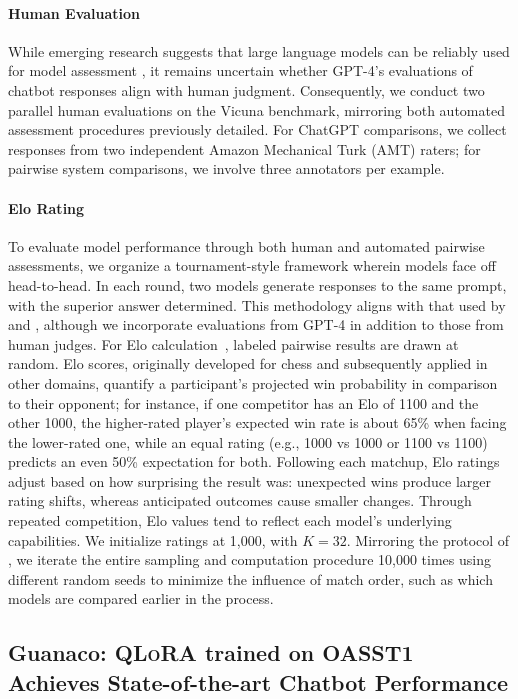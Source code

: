 \paragraph{Human Evaluation} While emerging research suggests that large language models can be reliably used for model assessment \citep{fu2023gptscore}, it remains uncertain whether GPT-4’s evaluations of chatbot responses align with human judgment. Consequently, we conduct two parallel human evaluations on the Vicuna benchmark, mirroring both automated assessment procedures previously detailed. For ChatGPT comparisons, we collect responses from two independent Amazon Mechanical Turk (AMT) raters; for pairwise system comparisons, we involve three annotators per example.

\paragraph{Elo Rating} To evaluate model performance through both human and automated pairwise assessments, we organize a tournament-style framework wherein models face off head-to-head. In each round, two models generate responses to the same prompt, with the superior answer determined. This methodology aligns with that used by \citet{bai2022training} and \citet{vicuna2023}, although we incorporate evaluations from GPT-4 in addition to those from human judges. For Elo calculation~\citep{elo1967proposed,elo1978rating}, labeled pairwise results are drawn at random. Elo scores, originally developed for chess and subsequently applied in other domains, quantify a participant’s projected win probability in comparison to their opponent; for instance, if one competitor has an Elo of 1100 and the other 1000, the higher-rated player’s expected win rate is about 65\% when facing the lower-rated one, while an equal rating (e.g., 1000 vs 1000 or 1100 vs 1100) predicts an even 50\% expectation for both. Following each matchup, Elo ratings adjust based on how surprising the result was: unexpected wins produce larger rating shifts, whereas anticipated outcomes cause smaller changes. Through repeated competition, Elo values tend to reflect each model’s underlying capabilities. We initialize ratings at 1,000, with $K=32$. Mirroring the protocol of \citet{vicuna2023}, we iterate the entire sampling and computation procedure 10,000 times using different random seeds to minimize the influence of match order, such as which models are compared earlier in the process.

\subsection{\textbf{Guanaco}: \textsc{QLoRA} trained on OASST1 Achieves State-of-the-art Chatbot Performance}

